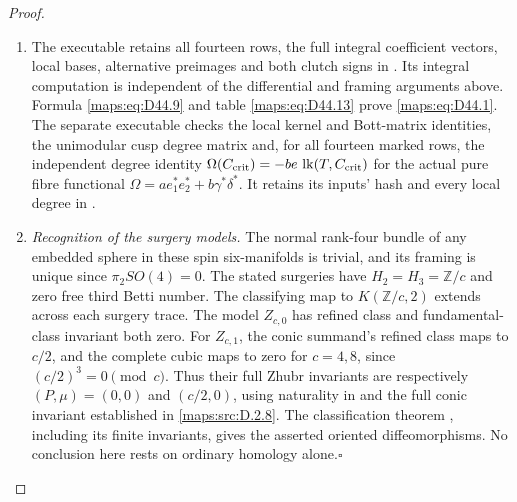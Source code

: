 \begin{proof}
\begin{enumerate}[label=\arabic*.,leftmargin=*]
\item The executable
retains all fourteen rows, the full integral coefficient
vectors, local bases, alternative preimages and both clutch
signs in
.
Its integral computation is independent of the differential
and framing arguments above. Formula \eqref{maps:eq:D44.9} and table
\eqref{maps:eq:D44.13} prove \eqref{maps:eq:D44.1}.
The separate executable
checks the local kernel and Bott-matrix identities, the
unimodular cusp degree matrix and, for all fourteen marked
rows, the independent degree identity
$\Omega(C_{\rm crit})=-be\,\operatorname{lk}(T,C_{\rm crit})$
for the actual pure fibre functional
$\Omega=a e_1^*e_2^*+b\gamma^*\delta^*$.
It retains its inputs' hash and every local degree in
.

\item \emph{Recognition of the surgery models.}
The normal rank-four bundle of any embedded sphere in these
spin six-manifolds is trivial, and its framing is unique
since $\pi_2SO(4)=0$. The stated surgeries have $H_2=H_3=\mathbb Z/c$
and zero free third Betti number. The classifying map to
$K(\mathbb Z/c,2)$ extends across each surgery trace.
The model $Z_{c,0}$ has refined class and fundamental-class
invariant both zero. For $Z_{c,1}$, the conic summand's refined
class maps to $c/2$, and the complete cubic maps to zero for
$c=4,8$, since $(c/2)^3=0\pmod c$. Thus their full Zhubr
invariants are respectively $(P,\mu)=(0,0)$ and $(c/2,0)$,
using naturality in \cite[Theorem 5]{manZhubr75} and the full
conic invariant established in \ref{maps:src:D.2.8}.
The classification theorem \cite[Theorem 3]{manZhubr75}, including
its finite invariants, gives the asserted oriented diffeomorphisms. No conclusion
here rests on ordinary homology alone.\hfill$\square$
\end{enumerate}
\end{proof}


